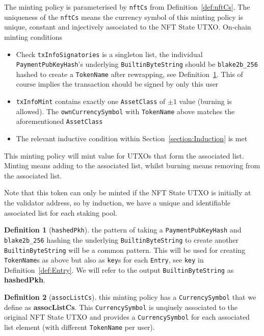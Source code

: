 \documentclass[10pt, a4paper]{article}
\theoremstyle{definition}
\newtheorem{definition}{Definition}[section]
\begin{document}
The minting policy is parameterised by \texttt{nftCs} from Definition~\ref{def:nftCs}. The uniqueness of the \texttt{nftCs} means the currency symbol of this minting policy is unique, constant and injectively associated to the NFT State UTXO.
On-chain minting conditions
\begin{itemize}
\item{Check \texttt{txInfoSignatories} is a singleton list, the individual \texttt{PaymentPubKeyHash}'s underlying \texttt{BuiltinByteString} should be \texttt{blake2b\_256} hashed to create a \texttt{TokenName} after rewrapping, see Definition~\ref{def:hashedPkh}. This of course implies the transaction should be signed by only this user}
\item{\texttt{txInfoMint} contains exactly one \texttt{AssetClass} of $\pm 1$ value (burning is allowed). The \texttt{ownCurrencySymbol} with \texttt{TokenName} above matches the aforementioned \texttt{AssetClass}}
\item{The relevant inductive condition within Section~\ref{section:Induction} is met}
\end{itemize}

This minting policy will mint value for UTXOs that form the associated list. Minting means adding to the associated list, whilst burning means removing from the associated list.

Note that this token can only be minted if the NFT State UTXO is initially at the validator address, so by induction, we have a unique and identifiable associated list for each staking pool.

\begin{definition}[\texttt{hashedPkh}]\label{def:hashedPkh} the pattern of taking a \texttt{PaymentPubKeyHash} and \texttt{blake2b\_256} hashing the underlying \texttt{BuiltinByteString} to create another \texttt{BuiltinByteString} will be a common pattern. This will be used for creating \texttt{TokenName}s as above but also as \texttt{key}s for each \texttt{Entry}, see \texttt{key} in Definition~\ref{def:Entry}. We will refer to the output \texttt{BuiltinByteString} as \textbf{hashedPkh}.
\end{definition}

\begin{definition}[\texttt{assocListCs}]\label{def:assocListCs} this minting policy has a \texttt{CurrencySymbol} that we define as \textbf{assocListCs}. This \texttt{CurrencySymbol} is unqiuely associated to the original NFT State UTXO and provides a \texttt{CurrencySymbol} for each associated list element (with different \texttt{TokenName} per user).
\end{definition}
\end{document}
